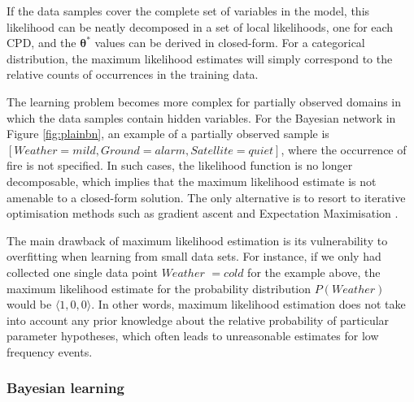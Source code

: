 If the data samples cover the complete set of variables in the model, this likelihood can be neatly decomposed in a set of local likelihoods, one for each CPD, and the $\boldsymbol\theta^*$ values can be derived in closed-form. For a categorical distribution,  the maximum likelihood estimates will simply correspond to the relative counts of occurrences in the training data. 


The learning problem becomes more complex for partially observed domains in which the data samples contain hidden variables.  For the Bayesian network in Figure \ref{fig:plainbn}, an example of a partially observed sample is $[ \mathit{Weather}\!=\!\mathit{mild}, \mathit{Ground}\!=\!alarm, \mathit{Satellite} \!=\!quiet]$, where the occurrence of fire is not specified.  In such cases, the likelihood function is no longer decomposable, which implies that the maximum likelihood estimate is not amenable to a closed-form solution. The only alternative is to resort to iterative optimisation methods such as gradient ascent \citep{binder1997} and Expectation Maximisation \citep{green1990}. 

The main drawback of maximum likelihood estimation is its vulnerability to overfitting when learning from small data sets. For instance, if we only had collected one single data point $\mathit{Weather}$ $= \mathit{cold}$ for the example above, the maximum likelihood estimate for the probability distribution $P(\mathit{Weather})$ would be $\langle 1, 0,0\rangle$.  In other words, maximum likelihood estimation does not take into account any prior knowledge about the relative probability of particular parameter hypotheses, which often leads to unreasonable estimates for low frequency events. 

\subsubsection*{Bayesian learning}


